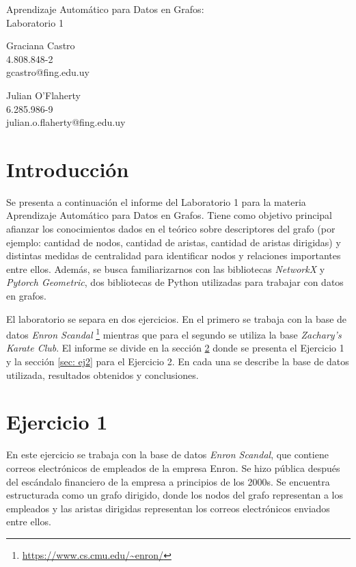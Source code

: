 \documentclass{article}
\begin{document}
\begin{center}
    {\LARGE Aprendizaje Automático para Datos en Grafos:} \\
    {\LARGE Laboratorio 1} \\
    \vspace{1em}
    \begin{minipage}{0.45\textwidth}
        \centering
        Graciana Castro \\
        4.808.848-2 \\
        gcastro@fing.edu.uy
    \end{minipage}
    \hfill
    \begin{minipage}{0.45\textwidth}
        \centering
        Julian O'Flaherty \\
        6.285.986-9 \\
        julian.o.flaherty@fing.edu.uy
    \end{minipage}
\end{center}


\section{Introducción}
Se presenta a continuación el informe del Laboratorio 1 para la materia Aprendizaje Automático para Datos en Grafos. Tiene como objetivo principal afianzar los conocimientos dados en el teórico sobre descriptores del grafo (por ejemplo: cantidad de nodos, cantidad de aristas, cantidad de aristas dirigidas) y distintas medidas de centralidad para identificar nodos y relaciones importantes entre ellos. Además, se busca familiarizarnos con las bibliotecas \textit{NetworkX} y \textit{Pytorch Geometric}, dos bibliotecas de Python utilizadas para trabajar con datos en grafos.

El laboratorio se separa en dos ejercicios. En el primero se trabaja con la base de datos \textit{Enron Scandal} \footnote{\url{https://www.cs.cmu.edu/~enron/}} mientras que para el segundo se utiliza la base \textit{Zachary's Karate Club}. El informe se divide en la sección \ref{sec: ej1} donde se presenta el Ejercicio 1 y la sección \ref{sec: ej2} para el Ejercicio 2. En cada una se describe la base de datos utilizada, resultados obtenidos y conclusiones.

\section{Ejercicio 1} \label{sec: ej1}
En este ejercicio se trabaja con la base de datos \textit{Enron Scandal}, que contiene correos electrónicos de empleados de la empresa Enron. Se hizo pública después del escándalo financiero de la empresa a principios de los 2000s. Se encuentra estructurada como un grafo dirigido, donde los nodos del grafo representan a los empleados y las aristas dirigidas representan los correos electrónicos enviados entre ellos.
\end{document}
